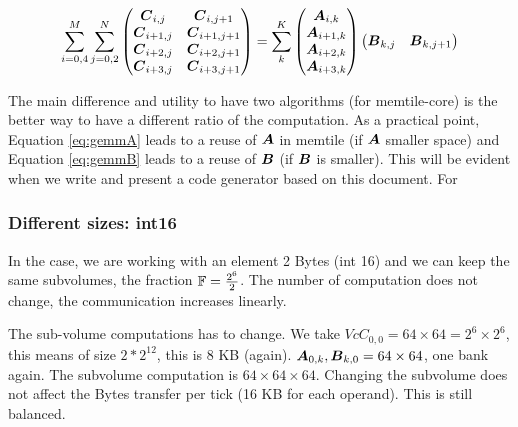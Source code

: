 \documentclass[conference]{IEEEtran}
\begin{document}
{\small \begin{equation*}
    \sum_{i=0,4}^M
    \sum_{j=0,2}^N
  \begin{pmatrix}
    {\boldsymbol C}_{i,j}  & {\boldsymbol C}_{i,  j+1}  \\
    {\boldsymbol C}_{i+1,j} & {\boldsymbol C}_{i+1,j+1} \\
    {\boldsymbol C}_{i+2,j} & {\boldsymbol C}_{i+2,j+1} \\
    {\boldsymbol C}_{i+3,j} & {\boldsymbol C}_{i+3,j+1} \\ 
  \end{pmatrix}    = \sum_k^K
  \begin{pmatrix}
    {\boldsymbol A}_{i,  k}  \\
    {\boldsymbol A}_{i+1,k}   \\
    {\boldsymbol A}_{i+2,k}  \\
    {\boldsymbol A}_{i+3,k}   \\
  \end{pmatrix}  
  \begin{pmatrix}
    {\boldsymbol B}_{k,j}  &  {\boldsymbol B}_{k,j+1} \\
  \end{pmatrix}    
\end{equation*}
}

The main difference and utility to have two algorithms (for
memtile-core) is the better way to have a different ratio of the
computation. As a practical point, Equation \ref{eq:gemmA} leads to a
reuse of ${\boldsymbol A}$ in memtile (if ${\boldsymbol A}$ smaller space) and Equation
\ref{eq:gemmB} leads to a reuse of ${\boldsymbol B}$ (if ${\boldsymbol B}$ is smaller).
This will be evident when we write and present a code generator based
on this document. For


\subsubsection{Different sizes: int16}
In the case, we are working with an element 2 Bytes (int 16) and we
can keep the same subvolumes, the fraction $\mathbb{F} = \frac{2^6}{2}$. The
number of computation does not change, the communication increases
linearly.

The sub-volume computations has to change. We take $Vc{C}_{0,0} =
64\times 64 = 2^6 \times 2^6$, this means of size $2*2^12$, this is 8
KB (again). ${\boldsymbol A}_{0,k}, {\boldsymbol B}_{k,0} = 64 \times 64$, one bank
again. The subvolume computation is $64\times 64 \times 64$. Changing
the subvolume does not affect the Bytes transfer per tick (16 KB for
each operand). This is still balanced.
\end{document}
